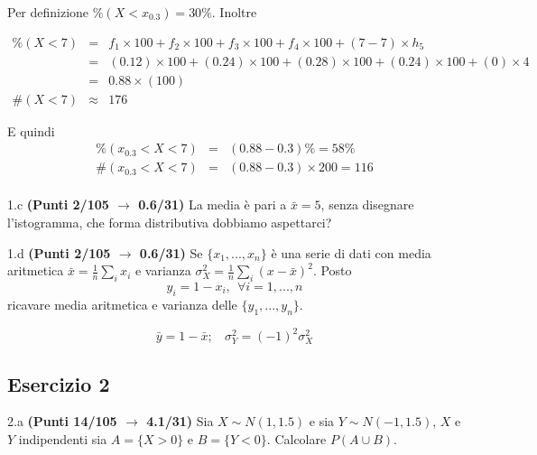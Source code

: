 \documentclass[
  11pt,
]{book}
\theoremstyle{mytheoremstyle}
\theoremstyle{mydefstyle}
\newenvironment{sol}
  {
  \begin{tcolorbox}[enhanced,breakable,arc=0.1mm,boxrule=1pt,colback=white,colframe=iblue,
  title=\bf \fontfamily{lmss}\selectfont \hspace{.5 cm} Soluzione,drop fuzzy shadow]

}{
\end{tcolorbox}
  }
\begin{document}
\begin{sol}
Per definizione \(\%(X<x_{ 0.3 })= 30 \%\). Inoltre

\begin{eqnarray*}
   \%(X< 7 ) &=&  f_{ 1 }\times 100+f_{ 2 }\times 100+f_{ 3 }\times 100+f_{ 4 }\times 100 +( 7 - 7 )\times h_{ 5 } \\
                &=&  ( 0.12 )\times 100+( 0.24 )\times 100+( 0.28 )\times 100+( 0.24 )\times 100 +( 0 )\times  4  \\
                &=&  0.88 \times(100) \\
\#(X< 7 )    &\approx& 176 
\end{eqnarray*}

E quindi
\begin{eqnarray*}
   \%( x_{0.3} < X < 7 ) &=& ( 0.88 - 0.3 )\%= 58 \% \\
   \#( x_{0.3} < X < 7 ) &=& ( 0.88 - 0.3 )\times  200 = 116  \\
\end{eqnarray*}

\end{sol}

1.c \textbf{(Punti 2/105 \(\rightarrow\) 0.6/31)} La media è pari a \(\bar x=5\), senza disegnare l'istogramma, che forma distributiva dobbiamo aspettarci?

1.d \textbf{(Punti 2/105 \(\rightarrow\) 0.6/31)} Se \(\{x_1,...,x_n\}\) è una serie di dati con media aritmetica \(\bar x=\frac 1n\sum_i x_i\) e varianza \(\sigma_X^2=\frac 1n\sum_i(x-\bar x)^2\). Posto
\[
y_i = 1-x_i,~~\forall i=1,...,n
\]
ricavare media aritmetica e varianza delle \(\{y_1,...,y_n\}\).

\begin{sol}
\[
\bar y = 1-\bar x;~~~~\sigma_Y^2=(-1)^2\sigma_X^2
\]

\end{sol}

\subsection{Esercizio 2}\label{esercizio-2-42}

2.a \textbf{(Punti 14/105 \(\rightarrow\) 4.1/31)} Sia \(X\sim N(1,1.5)\) e sia \(Y\sim N(-1,1.5)\), \(X\) e \(Y\) indipendenti sia \(A=\{X>0\}\) e \(B=\{Y<0\}\).
Calcolare \(P(A\cup B)\).
\end{document}
